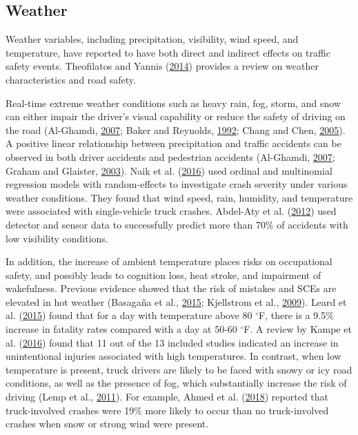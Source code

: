 \documentclass[12pt]{book}
\numberwithin{equation}{chapter}
\begin{document}
\hypertarget{weather}{%
\subsection{Weather}\label{weather}}

Weather variables, including precipitation, visibility, wind speed, and temperature, have reported to have both direct and indirect effects on traffic safety events. Theofilatos and Yannis (\protect\hyperlink{ref-theofilatos2014review}{2014}) provides a review on weather characteristics and road safety.

Real-time extreme weather conditions such as heavy rain, fog, storm, and snow can either impair the driver's visual capability or reduce the safety of driving on the road (Al-Ghamdi, \protect\hyperlink{ref-al2007experimental}{2007}; Baker and Reynolds, \protect\hyperlink{ref-baker1992wind}{1992}; Chang and Chen, \protect\hyperlink{ref-chang2005data}{2005}). A positive linear relationship between precipitation and traffic accidents can be observed in both driver accidents and pedestrian accidents (Al-Ghamdi, \protect\hyperlink{ref-al2007experimental}{2007}; Graham and Glaister, \protect\hyperlink{ref-graham2003spatial}{2003}). Naik et al. (\protect\hyperlink{ref-naik2016weather}{2016}) used ordinal and multinomial regression models with random-effects to investigate crash severity under various weather conditions. They found that wind speed, rain, humidity, and temperature were associated with single-vehicle truck crashes. Abdel-Aty et al. (\protect\hyperlink{ref-abdel2012real}{2012}) used detector and sensor data to successfully predict more than 70\% of accidents with low visibility conditions.

In addition, the increase of ambient temperature places risks on occupational safety, and possibly leads to cognition loss, heat stroke, and impairment of wakefulness. Previous evidence showed that the risk of mistakes and SCEs are elevated in hot weather (Basagaña et al., \protect\hyperlink{ref-basagana2015high}{2015}; Kjellstrom et al., \protect\hyperlink{ref-kjellstrom2009direct}{2009}). Leard et al. (\protect\hyperlink{ref-leard2015weather}{2015}) found that for a day with temperature above 80 \(^{\circ}\)F, there is a 9.5\% increase in fatality rates compared with a day at 50-60 \(^{\circ}\)F. A review by Kampe et al. (\protect\hyperlink{ref-im2016impact}{2016}) found that 11 out of the 13 included studies indicated an increase in unintentional injuries associated with high temperatures. In contrast, when low temperature is present, truck drivers are likely to be faced with snowy or icy road conditions, as well as the presence of fog, which substantially increase the risk of driving (Lemp et al., \protect\hyperlink{ref-lemp2011analysis}{2011}). For example, Ahmed et al. (\protect\hyperlink{ref-ahmed2018effects}{2018}) reported that truck-involved crashes were 19\% more likely to occur than no truck-involved crashes when snow or strong wind were present.
\end{document}
